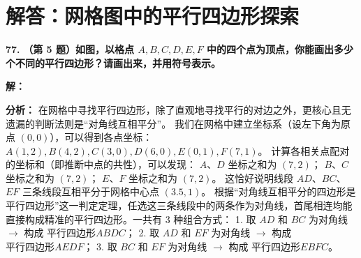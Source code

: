\newpage


\section{解答：网格图中的平行四边形探索}

\vspace{0.6cm}

\textbf{\LARGE 77.} \textbf{（第 5 题）如图，以格点 $A, B, C, D, E, F$ 中的四个点为顶点，你能画出多少个不同的平行四边形？请画出来，并用符号表示。}

\vspace{0.4cm}
\textbf{解：}

\textbf{分析：} 在网格中寻找平行四边形，除了直观地寻找平行的对边之外，更核心且无遗漏的判断法则是“对角线互相平分”。
我们在网格中建立坐标系（设左下角为原点 $(0,0)$），可以得到各点坐标：
$A(1,2), B(4,2), C(3,0), D(6,0), E(0,1), F(7,1)$。
计算各相关点配对的坐标和（即推断中点的共性），可以发现：
$A$、$D$ 坐标之和为 $(7,2)$；
$B$、$C$ 坐标之和为 $(7,2)$；
$E$、$F$ 坐标之和为 $(7,2)$。
这恰好说明线段 $AD$、$BC$、$EF$ 三条线段互相平分于网格中心点 $(3.5, 1)$。
根据“对角线互相平分的四边形是平行四边形”这一判定定理，任选这三条线段中的两条作为对角线，首尾相连均能直接构成精准的平行四边形。一共有 $3$ 种组合方式：
1. 取 $AD$ 和 $BC$ 为对角线 $\to$ 构成 $\text{平行四边形} ABDC$；
2. 取 $AD$ 和 $EF$ 为对角线 $\to$ 构成 $\text{平行四边形} AEDF$；
3. 取 $BC$ 和 $EF$ 为对角线 $\to$ 构成 $\text{平行四边形} EBFC$。

